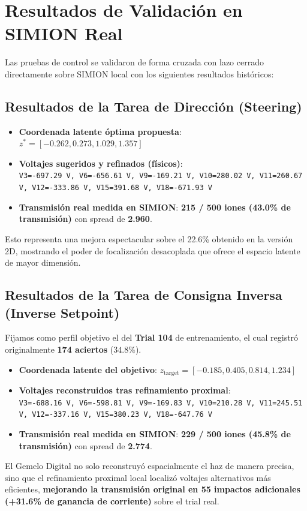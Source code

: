 \documentclass[12pt,letterpaper]{article}
\begin{document}
\section{Resultados de Validación en SIMION Real}
Las pruebas de control se validaron de forma cruzada con lazo cerrado directamente sobre SIMION local con los siguientes resultados históricos:

\subsection{Resultados de la Tarea de Dirección (Steering)}
\begin{itemize}
    \item \textbf{Coordenada latente óptima propuesta}: $z^* = [-0.262, 0.273, 1.029, 1.357]$
    \item \textbf{Voltajes sugeridos y refinados (físicos)}: \\
    \texttt{V3=-697.29 V, V6=-656.61 V, V9=-169.21 V, V10=280.02 V, V11=260.67 V, V12=-333.86 V, V15=391.68 V, V18=-671.93 V}
    \item \textbf{Transmisión real medida en SIMION}: \textbf{215 / 500 iones (43.0\% de transmisión)} con spread de \textbf{2.960}.
\end{itemize}
Esto representa una mejora espectacular sobre el 22.6\% obtenido en la versión 2D, mostrando el poder de focalización desacoplada que ofrece el espacio latente de mayor dimensión.

\subsection{Resultados de la Tarea de Consigna Inversa (Inverse Setpoint)}
Fijamos como perfil objetivo el del \textbf{Trial 104} de entrenamiento, el cual registró originalmente \textbf{174 aciertos} ($34.8\%$).
\begin{itemize}
    \item \textbf{Coordenada latente del objetivo}: $z_{\text{target}} = [-0.185, 0.405, 0.814, 1.234]$
    \item \textbf{Voltajes reconstruidos tras refinamiento proximal}: \\
    \texttt{V3=-688.16 V, V6=-598.81 V, V9=-169.83 V, V10=210.28 V, V11=245.51 V, V12=-337.16 V, V15=380.23 V, V18=-647.76 V}
    \item \textbf{Transmisión real medida en SIMION}: \textbf{229 / 500 iones (45.8\% de transmisión)} con spread de \textbf{2.774}.
\end{itemize}
El Gemelo Digital no solo reconstruyó espacialmente el haz de manera precisa, sino que el refinamiento proximal local localizó voltajes alternativos más eficientes, \textbf{mejorando la transmisión original en 55 impactos adicionales (+31.6\% de ganancia de corriente)} sobre el trial real.
\end{document}
